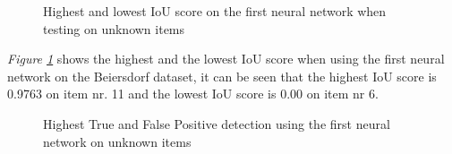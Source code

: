 \begin{figure}[h]
    \centering
    \hfill
    
    \caption{Highest and lowest IoU score on the first neural network when testing on unknown items}
    \label{fig:v1unknowniou}
\end{figure}
\textit{Figure \ref{fig:v1unknowniou}} shows the highest and the lowest IoU score when using the first neural network on the Beiersdorf dataset, it can be seen that the highest IoU score is 0.9763 on item nr. 11 and the lowest IoU score is 0.00 on item nr 6.

\begin{figure}[h]
    \centering
    \hfill
    
    \caption{Highest True and False Positive detection using the first neural network on unknown items}
    \label{fig:v1max}
\end{figure}

